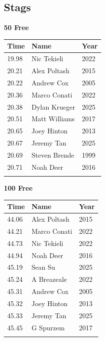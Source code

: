 \subsection{Stags}
\vspace{1.2em}
\noindent\begin{minipage}[t]{0.48\textwidth}
\centering
\textbf{\textcolor{teamprimary}{50 Free}}\par
\vspace{0.5em}
\centering
\small
\renewcommand{\arraystretch}{1.0}
\setlength{\tabcolsep}{4pt}
\begin{tabular}{@{}p{1.8cm}p{3.0cm}p{1.0cm}@{}}
\toprule
\textbf{Time} & \textbf{Name} & \textbf{Year} \\
\midrule
19.98 & Nic Tekieli & 2022 \\
20.21 & Alex Poltash & 2015 \\
20.22 & Andrew Cox & 2005 \\
20.36 & Marco Conati & 2022 \\
20.38 & Dylan Krueger & 2025 \\
20.51 & Matt Williams & 2017 \\
20.65 & Joey Hinton & 2013 \\
20.67 & Jeremy Tan & 2025 \\
20.69 & Steven Brende & 1999 \\
20.71 & Noah Deer & 2016 \\
\bottomrule
\vspace{0.5em}
\end{tabular}
\end{minipage}
\hfill
\begin{minipage}[t]{0.48\textwidth}
\centering
\textbf{\textcolor{teamprimary}{100 Free}}\par
\vspace{0.5em}
\centering
\small
\renewcommand{\arraystretch}{1.0}
\setlength{\tabcolsep}{4pt}
\begin{tabular}{@{}p{1.8cm}p{3.0cm}p{1.0cm}@{}}
\toprule
\textbf{Time} & \textbf{Name} & \textbf{Year} \\
\midrule
44.06 & Alex Poltash & 2015 \\
44.21 & Marco Conati & 2022 \\
44.73 & Nic Tekieli & 2022 \\
44.94 & Noah Deer & 2016 \\
45.19 & Sean Su & 2025 \\
45.24 & A Breazeale & 2022 \\
45.31 & Andrew Cox & 2005 \\
45.32 & Joey Hinton & 2013 \\
45.33 & Jeremy Tan & 2025 \\
45.45 & G Spurzem & 2017 \\
\bottomrule
\vspace{0.5em}
\end{tabular}
\end{minipage}

